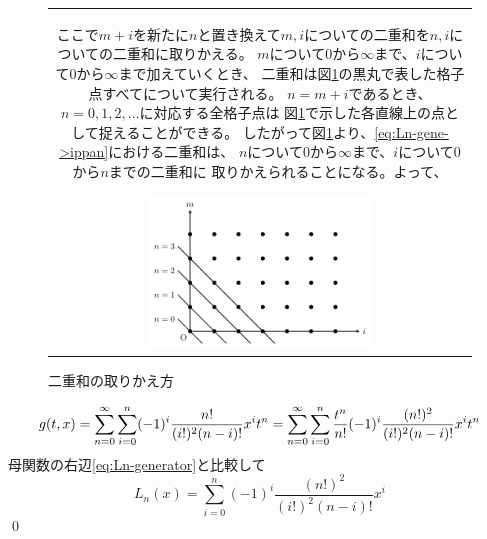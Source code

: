 \documentclass[../main/main]{subfiles}
\begin{document}
\vspace{-12pt}
\begin{figure}[H]
  \begin{tabular}{c}
 \begin{minipage}{0.54\hsize}\small
ここで$m+i$を新たに$n$と置き換えて$m, i$についての二重和を$n, i$についての二重和に取りかえる。
$m$について$0$から$\infty$まで、$i$について$0$から$\infty$まで加えていくとき、
二重和は図\ref{fig:laguerre}の黒丸で表した格子点すべてについて実行される。
$n=m+i$であるとき、$n=0, 1, 2, \dots$に対応する全格子点は
図\ref{fig:laguerre}で示した各直線上の点として捉えることができる。
したがって図\ref{fig:laguerre}より、\eqref{eq:Ln-gene->ippan}における二重和は、
$n$について$0$から$\infty$まで、$i$について$0$から$n$までの二重和に
取りかえられることになる。よって、
 \end{minipage}
  
  \begin{minipage}{0.04\hsize}
    \hspace{0pt}
  \end{minipage}

 \begin{minipage}{0.42\hsize}
    \centering
    \includegraphics[width=60mm]{../TikZ/laguerre/laguerre.pdf}
    \caption{二重和の取りかえ方}
    \label{fig:laguerre}
 \end{minipage}
  \end{tabular}
\end{figure}

\vspace{-12pt}
\begin{equation*}
  g(t, x) = \sum_{n=0}^\infty \sum_{i=0}^n (-1)^i \frac{n!}{(i!)^2(n-i)!} x^i t^{n}
	= \sum_{n=0}^\infty \sum_{i=0}^n \frac{t^n}{n!} (-1)^i \frac{(n!)^2}{(i!)^2(n-i)!} x^i t^{n} \notag\\
\end{equation*}
母関数の右辺\eqref{eq:Ln-generator}と比較して
\begin{equation*}
  L_n(x) = \sum_{i=0}^n (-1)^i \frac{(n!)^2}{(i!)^2 (n-i)!} x^i
\end{equation*}\qed
\end{document}
